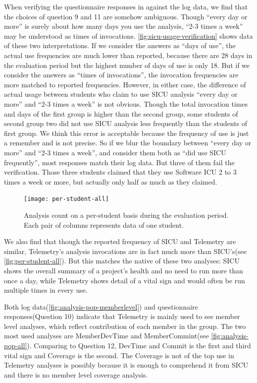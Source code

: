 \documentclass[11pt]{article}
\begin{document}
When verifying the questionnaire responses in  against the log data, we find that the choices of question 9 and 11 are somehow ambiguous. Though ``every day or more'' is surely about how many days you use the analysis, ``2-3 times a week'' may be understood as times of invocations. \autoref{fig:sicu-usage-verification} shows data of these two interpretations. If we consider the answers as ``days of use'', the actual use frequencies are much lower than reported, because there are 28 days in the evaluation period but the highest number of days of use is only 18. But if we consider the answers as ``times of invocations'', the invocation frequencies are more matched to reported frequencies. However, in either case, the difference of actual usage between students who claim to use SICU analysis ``every day or more'' and ``2-3 times a week'' is not obvious. Though the total invocation times and days of the first group is higher than the second group, some students of second group two did not use SICU analysis less frequently than the students of first group. We think this error is acceptable because the frequency of use is just a remember and is not precise. So if we blur the boundary between ``every day or more'' and ``2-3 times a week'', and consider them both as ``did use SICU frequently'', most responses match their log data. But three of them fail the verification. Those three students claimed that they use Software ICU 2 to 3 times a week or more, but actually only half as much as they claimed.

\begin{figure}[htbp] %
   \centering
   \texttt{[image: per-student-all]} 
   \caption{Analysis count on a per-student basis during the evaluation period. Each pair of columns represents data of one student.}
   \label{fig:per-student-all}
\end{figure}

We also find that though the reported frequency of SICU and Telemetry are similar, Telemetry's analysis invocations are in fact much more than SICU's(see \autoref{fig:per-student-all}). But this matches the native of these two analyses: SICU shows the overall summary of a project's health and no need to run more than once a day, while Telemetry shows detail of a vital sign and would often be run multiple times in every use.

Both log data(\autoref{fig:analysis-pop-memberlevel}) and questionnaire responses(Question 10) indicate that Telemetry is mainly used to see member level analyses, which reflect contribution of each member in the group. The two most used analyses are MemberDevTime and MemberCommint(see \autoref{fig:analysis-pop-all}). Comparing to Question 12, DevTime and Commit is the first and third vital sign and Coverage is the second. The Coverage is not of the top use in Telemetry analyses is possibly because it is enough to comprehend it from SICU and there is no member level coverage analysis.
\end{document}
